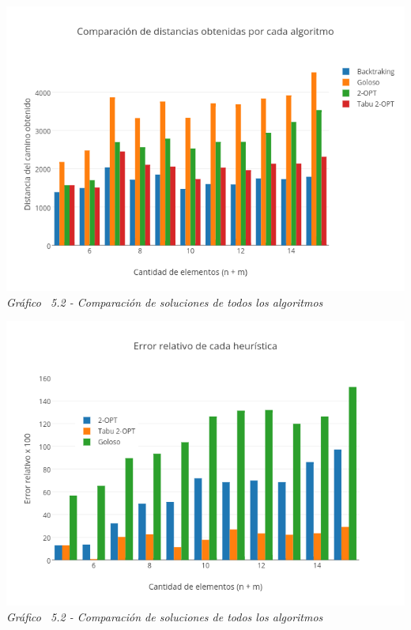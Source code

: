 \vspace*{0.3cm} \vspace*{0.3cm}
  \begin{center}
 \includegraphics[scale=0.5]{./EJ5/comparativo.png}\\
 {\textit{Gráfico \ 5.2 - Comparaci\'on de soluciones de todos los algoritmos}}
  \end{center}
  \vspace*{0.3cm}
  
  \vspace*{0.3cm} \vspace*{0.3cm}
  \begin{center}
 \includegraphics[scale=0.5]{./EJ5/errorChico.png}\\
 {\textit{Gráfico \ 5.2 - Comparaci\'on de soluciones de todos los algoritmos}}
  \end{center}
  \vspace*{0.3cm}

